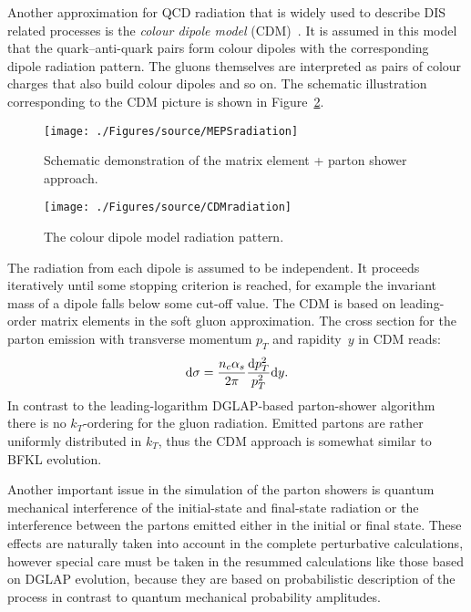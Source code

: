Another approximation for QCD radiation that is widely used to describe DIS related processes is the \emph{colour dipole model} (CDM)~\cite{np:b306:746,Andersson:1988ee,Andersson:1990dp,Gustafson:1992uh,Andersson:1988gp,Gustafson:1986db}. It is assumed in this model that the quark--anti-quark pairs form colour dipoles with the corresponding dipole radiation pattern. The gluons themselves are interpreted as pairs of colour charges that also build colour dipoles and so on. The schematic illustration corresponding to the CDM picture is shown in Figure~\ref{fig:cdm}. 
\begin{figure}[t]
	\centering
		\texttt{[image: ./Figures/source/MEPSradiation]}
	\caption{Schematic demonstration of the matrix element + parton shower approach.}
\label{fig:meps}
\end{figure}
\begin{figure}[t]%
\centering
\texttt{[image: ./Figures/source/CDMradiation]}%
\caption{The colour dipole model radiation pattern.}%
\label{fig:cdm}%
\end{figure}
The radiation from each dipole is assumed to be independent. It proceeds iteratively until some stopping criterion is reached, for example the invariant mass of a dipole falls below some cut-off  value. The CDM is based on leading-order matrix elements in the soft gluon approximation. The cross section for the parton emission with transverse momentum $p_T$ and rapidity~$y$ in CDM reads:
\begin{equation}
\mathrm{d}\sigma = \frac{n_c\mbox{$\alpha_{s}$}}{2\pi}\frac{\mathrm{d}p_T^2}{p_T^2}\mathrm{d}y.
\end{equation}
In contrast to the leading-logarithm DGLAP-based parton-shower algorithm there is no $k_T$-ordering for the gluon radiation. Emitted partons are rather uniformly distributed in $k_T$, thus the CDM approach is somewhat similar to BFKL evolution.

Another important issue in the simulation of the parton showers is quantum mechanical interference of the initial-state and final-state radiation or the interference between the partons emitted either in the initial or final state. These effects are naturally taken into account in the complete perturbative calculations, however special care must be taken in the resummed calculations like those based on DGLAP evolution, because they are based on probabilistic description of the process in contrast to quantum mechanical probability amplitudes.

